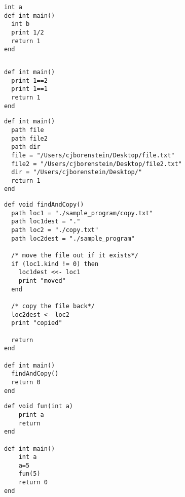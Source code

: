 \documentclass[11pt]{article}
\begin{document}
\begin{listing}[H]
  \begin{verbatim}
int a
def int main()
  int b
  print 1/2
  return 1
end
  \end{verbatim}
\end{listing}

\begin{listing}[H]
  \begin{verbatim}

  \end{verbatim}
\end{listing}

\begin{listing}[H]
  \begin{verbatim}
def int main()
  print 1==2
  print 1==1
  return 1
end
  \end{verbatim}
\end{listing}

\begin{listing}[H]
  \begin{verbatim}
def int main()
  path file
  path file2
  path dir
  file = "/Users/cjborenstein/Desktop/file.txt"
  file2 = "/Users/cjborenstein/Desktop/file2.txt"
  dir = "/Users/cjborenstein/Desktop/"
  return 1
end
  \end{verbatim}
\end{listing}

\begin{listing}[H]
  \begin{verbatim}
def void findAndCopy()
  path loc1 = "./sample_program/copy.txt"
  path loc1dest = "."
  path loc2 = "./copy.txt"
  path loc2dest = "./sample_program"

  /* move the file out if it exists*/
  if (loc1.kind != 0) then
    loc1dest <<- loc1
    print "moved"
  end

  /* copy the file back*/
  loc2dest <- loc2
  print "copied"

  return
end

def int main()
  findAndCopy()
  return 0
end
  \end{verbatim}
\end{listing}

\begin{listing}[H]
  \begin{verbatim}
def void fun(int a)
    print a
    return
end

def int main()
    int a
    a=5
    fun(5)
    return 0
end
  \end{verbatim}
\end{listing}
\end{document}
